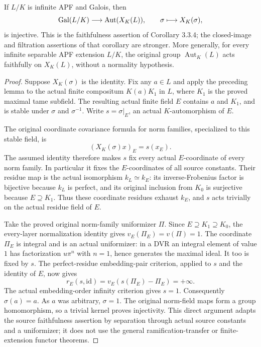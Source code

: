 \begin{corollary}
\label{fw:faithful-action}
\leanok
If $L/K$ is infinite APF and Galois, then
\[
 \operatorname{Gal}(L/K)\longrightarrow\operatorname{Aut}(X_K(L)),
 \qquad \sigma\longmapsto X_K(\sigma),
\]
is injective. This is the faithfulness assertion of Corollary 3.3.4;
the closed-image and filtration assertions of that corollary are stronger.
More generally, for every infinite separable APF extension $L/K$,
the original group $\operatorname{Aut}_K(L)$ acts faithfully on
$X_K(L)$, without a normality hypothesis.
\end{corollary}
\begin{proof}
Suppose $X_K(\sigma)$ is the identity. Fix any $a\in L$ and
apply the preceding lemma to the actual finite compositum
$K(a)K_1$ in $L$, where $K_1$ is the proved maximal tame
subfield. The resulting actual finite field $E$ contains $a$
and $K_1$, and is stable under $\sigma$ and $\sigma^{-1}$.
Write $s=\sigma|_E$, an actual $K$-automorphism of $E$.

The original coordinate covariance formula for norm families,
specialized to this stable field, is
\[
 (X_K(\sigma)x)_E=s(x_E).
\]
The assumed identity therefore makes $s$ fix every actual
$E$-coordinate of every norm family. In particular it fixes
the $E$-coordinates of all source constants. Their residue map
is the actual isomorphism $k_L\simeq k_E$: its inverse-Frobenius
factor is bijective because $k_L$ is perfect, and its original
inclusion from $K_0$ is surjective because $E\supseteq K_1$.
Thus these coordinate residues exhaust $k_E$, and $s$ acts
trivially on the actual residue field of $E$.

Take the proved original norm-family uniformizer $\Pi$.
Since $E\supseteq K_1\supseteq K_0$, the every-layer
normalization identity gives $v_E(\Pi_E)=v(\Pi)=1$.
The coordinate $\Pi_E$ is integral and is an actual uniformizer:
in a DVR an integral element of value $1$ has factorization
$u\pi^n$ with $n=1$, hence generates the maximal ideal.
It too is fixed by $s$. The perfect-residue embedding-pair
criterion, applied to $s$ and the identity of $E$, now gives
\[
 r_E(s,\mathrm{id})=v_E(s(\Pi_E)-\Pi_E)=+\infty.
\]
The actual embedding-order infinity criterion gives $s=1$.
Consequently $\sigma(a)=a$. As $a$ was arbitrary, $\sigma=1$.
The original norm-field maps form a group homomorphism, so a
trivial kernel proves injectivity. This direct argument adapts
the source faithfulness assertion by separation through actual
source constants and a uniformizer; it does not use the general
ramification-transfer or finite-extension functor theorems.
\end{proof}

